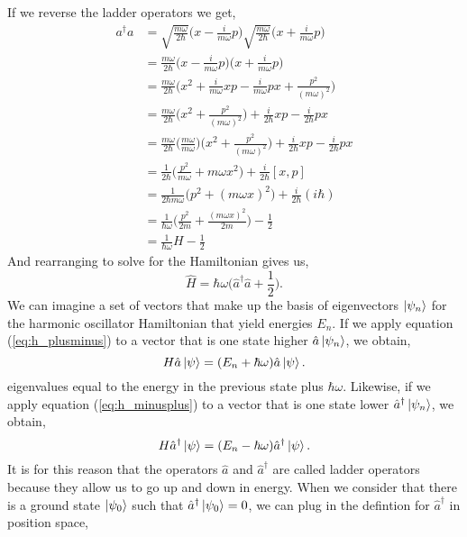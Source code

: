 \documentclass{article}
\newcommand{\be}{\begin{equation}}
\newcommand{\ee}{\end{equation}}
\begin{document}
If we reverse the ladder operators we get,
\be
  \begin{split}
    a^{\dagger}a &= \sqrt{\frac{m \omega}{2 \hbar}} \Big( x - \frac{i}{m \omega} p\Big) \sqrt{\frac{m \omega}{2 \hbar}} \Big( x + \frac{i}{m \omega} p\Big) \\
    &= \frac{m \omega}{2 \hbar} \Big( x - \frac{i}{m \omega} p\Big) \Big( x + \frac{i}{m \omega} p\Big) \\
    &= \frac{m \omega}{2 \hbar} \Big( x^2 + \frac{i}{m \omega}xp - \frac{i}{m \omega}px + \frac{p^2}{(m \omega)^2}\Big) \\
    &= \frac{m \omega}{2 \hbar} \Big( x^2 + \frac{p^2}{(m \omega)^2}\Big) + \frac{i}{2 \hbar}xp - \frac{i}{2 \hbar}px \\
    &= \frac{m \omega}{2 \hbar} \Big( \frac{m \omega}{m \omega} \Big) \Big( x^2 + \frac{p^2}{(m \omega)^2}\Big) + \frac{i}{2 \hbar}xp - \frac{i}{2 \hbar}px \\
    &= \frac{1}{2 \hbar} \Big( \frac{p^2}{m \omega} + m \omega x^2 \Big) + \frac{i}{2 \hbar} [x,p] \\
    &= \frac{1}{2 \hbar m \omega} \Big( p^2 + (m \omega x)^2 \Big) + \frac{i}{2 \hbar} (i \hbar) \\
    &= \frac{1}{\hbar \omega} \Big( \frac{p^2}{2m} + \frac{(m \omega x)^2}{2m} \Big) - \frac{1}{2} \\
    &= \frac{1}{\hbar \omega}H - \frac{1}{2}
  \end{split}
\ee
And rearranging to solve for the Hamiltonian gives us,
\be \label{eq:h_minusplus}
  \hat{H} = \hbar \omega \Big(\hat{a}^{\dagger} \hat{a} + \frac{1}{2} \Big) .
\ee
We can imagine a set of vectors that make up the basis of eigenvectors $\ket{\psi_n}$ for the harmonic oscillator Hamiltonian that yield energies $E_n$.
If we apply equation (\ref{eq:h_plusminus}) to a vector that is one state higher $\hat{a}\ket{\psi_n}$, we obtain,
\be
  H \hat{a}\ket{\psi} = (E_n + \hbar \omega) \hat{a}\ket{\psi}.
\ee
eigenvalues equal to the energy in the previous state plus $\hbar \omega$.
Likewise, if we apply equation (\ref{eq:h_minusplus}) to a vector that is one state lower $\hat{a}^{\dagger}\ket{\psi_n}$, we obtain,
\be
  H \hat{a}^{\dagger}\ket{\psi} = (E_n - \hbar \omega) \hat{a}^{\dagger}\ket{\psi} .
\ee
It is for this reason that the operators $\hat{a}$ and $\hat{a}^{\dagger}$ are called ladder operators because they allow us to go up and down in energy.\cite{griffiths,shankar}
When we consider that there is a ground state $\ket{\psi_0}$ such that $\hat{a}^{\dagger}\ket{\psi_0} = 0$, we can plug in the defintion for $\hat{a}^{\dagger}$ in position space,
\end{document}
